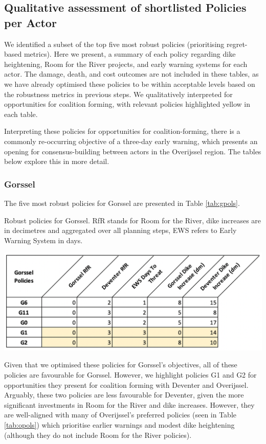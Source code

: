 \subsection{Qualitative assessment of shortlisted Policies per Actor}
We identified a subset of the top five most robust policies (prioritising regret-based metrics). Here we present, a summary of each policy regarding dike heightening, Room for the River projects, and early warning systems for each actor. The damage, death, and cost outcomes are not included in these tables, as we have already optimised these policies to be within acceptable levels based on the robustness metrics in previous steps. We qualitatively interpreted for opportunities for coalition forming, with relevant policies highlighted yellow in each table.

Interpreting these policies for opportunities for coalition-forming, there is a commonly re-occurring objective of a three-day early warning, which presents an opening for consensus-building between actors in the Overijssel region. The tables below explore this in more detail.

\subsubsection{Gorssel}
The five most robust policies for Gorssel are presented in Table \ref{tab:gpols}.

\begin{table}[h!]
  \centering
  \captionsetup{justification=centering,margin=2cm}
  \caption{Robust policies for Gorssel. RfR stands for Room for the River, dike increases are in decimetres and aggregated over all planning steps, EWS refers to Early Warning System in days.}
  \label{tab:gpols}
  \includegraphics[width=0.8\linewidth]{report/figures/gpols.png}
\end{table}

\noindent Given that we optimised these policies for Gorssel's objectives, all of these policies are favourable for Gorssel. However, we highlight policies G1 and G2 for opportunities they present for coalition forming with Deventer and Overijssel. Arguably, these two policies are less favourable for Deventer, given the more significant investments in Room for the River and dike increases. However, they are well-aligned with many of Overijssel's preferred policies (seen in Table \ref{tab:opols}) which prioritise earlier warnings and modest dike heightening (although they do not include Room for the River policies).

